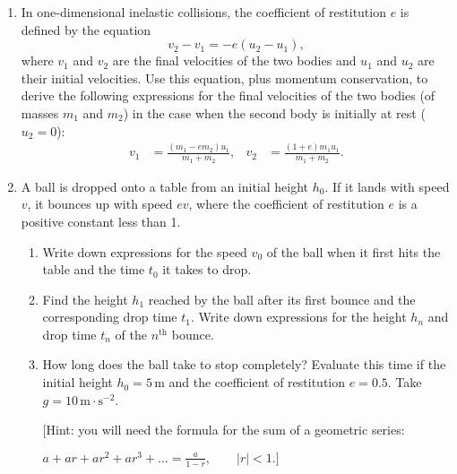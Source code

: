 \documentclass[12pt]{article}
\begin{document}
\begin{enumerate}
\item In one-dimensional inelastic collisions, the coefficient of
  restitution $e$ is defined by the equation
  \begin{displaymath}
    v_2 - v_1 = -e (u_2 - u_1),
  \end{displaymath}
  where $v_1$ and $v_2$ are the final velocities of the two bodies and
  $u_1$ and $u_2$ are their initial velocities. Use this equation, plus
  momentum conservation, to derive the following expressions for the
  final velocities of the two bodies (of masses $m_1$ and $m_2$) in the
  case when the second body is initially at rest ($u_2 = 0$):
  \begin{align*}
    v_1 &= \frac{(m_1 - e m_2) u_1}{m_1 + m_2},
    &
      v_2 &= \frac{(1 + e)m_1 u_1}{m_1 + m_2}.
  \end{align*}







\item 
  A ball is dropped onto a table from an initial height $h_0$. If it
  lands with speed $v$, it bounces up with speed $ev$, where the
  coefficient of restitution $e$ is a positive constant less than 1.
  \begin{enumerate}
  \item Write down expressions for the speed $v_0$ of the ball when it
    first hits the table and the time $t_0$ it takes to drop.
    
  \item Find the height $h_1$ reached by the ball after its first bounce
    and the corresponding drop time $t_1$. Write down expressions for
    the height $h_n$ and drop time $t_n$ of the $n^{\text{th}}$ bounce.
  \item How long does the ball take to stop completely? Evaluate this
    time if the initial height $h_0 = 5\,$m and the coefficient of
    restitution $e = 0.5$. Take $g = 10\,\text{m}\cdot\text{s}^{-2}$.

    [Hint: you will need the formula for the sum of a geometric series:

    \centerline{$\displaystyle a + ar + ar^2 + ar^3 + \ldots =
      \frac{a}{1-r}, \qquad |r|<1.]$}
  \end{enumerate}
  

\end{enumerate}
\end{document}
